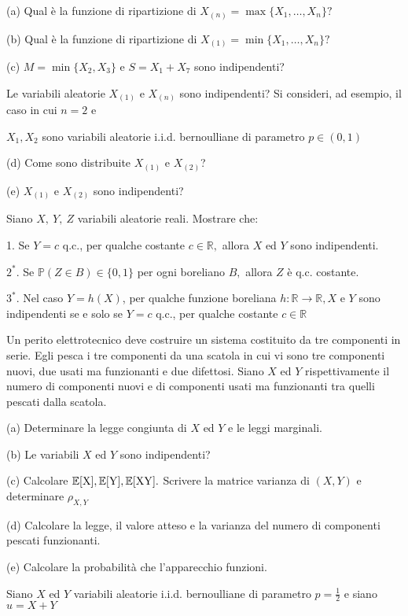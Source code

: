 (a) Qual è la funzione di ripartizione di $X_{(n)} =\max\{X_{1} ,\dots ,X_{n}\} ?$

(b) Qual è la funzione di ripartizione di $X_{(1)} =\min\{X_{1} ,\dots ,X_{n}\} ?$

(c) $M=\min\{X_{2} ,X_{3}\}$ e $S=X_{1} +X_{7}$ sono indipendenti?

Le variabili aleatorie $X_{(1)}$ e $X_{(n)}$ sono indipendenti? Si consideri, ad esempio, il caso in cui $n=2$ e

$X_{1} ,X_{2}$ sono variabili aleatorie i.i.d. bernoulliane di parametro $p\in (0,1)$

(d) Come sono distribuite $X_{(1)}$ e $X_{(2)}$?

(e) $X_{(1)}$ e $X_{(2)}$ sono indipendenti?
\Esercizio{}

Siano $X,\ Y,\ Z$ variabili aleatorie reali. Mostrare che:

1. Se $Y=c$ q.c., per qualche costante $c\in \mathbb{R} ,$ allora $X$ ed $Y$ sono indipendenti.

$2^{*} .$ Se $\mathbb{P} (Z\in B)\in \{0,1\}$ per ogni boreliano $B,$ allora $Z$ è q.c. costante.

$3^{*} .$ Nel caso $Y=h(X)$, per qualche funzione boreliana $h:\mathbb{R}\rightarrow \mathbb{R} ,X$ e $Y$ sono indipendenti se e solo se $Y=c$ q.c., per qualche costante $c\in \mathbb{R}$
\Esercizio{}

Un perito elettrotecnico deve costruire un sistema costituito da tre componenti in serie. Egli pesca i tre componenti da una scatola in cui vi sono tre componenti nuovi, due usati ma funzionanti e due difettosi. Siano $X$ ed $Y$ rispettivamente il numero di componenti nuovi e di componenti usati ma funzionanti tra quelli pescati dalla scatola.

(a) Determinare la legge congiunta di $X$ ed $Y$ e le leggi marginali.

(b) Le variabili $X$ ed $Y$ sono indipendenti?

(c) Calcolare $\mathbb{E} [\mathrm{X} ],\mathbb{E} [\mathrm{Y} ],\mathbb{E} [\mathrm{XY} ].$ Scrivere la matrice varianza di $(X,Y)$ e determinare $\rho _{X,Y}$

(d) Calcolare la legge, il valore atteso e la varianza del numero di componenti pescati funzionanti.

(e) Calcolare la probabilità che l'apparecchio funzioni.
\Esercizio{}

Siano $X$ ed $Y$ variabili aleatorie i.i.d. bernoulliane di parametro $p=\frac{1}{2}$ e siano $u=X+Y$

